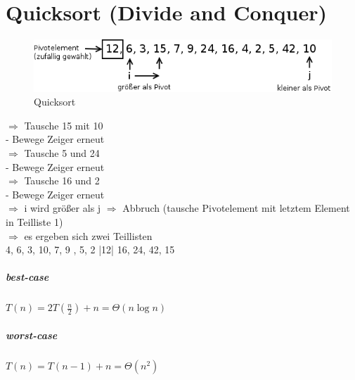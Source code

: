 \chapter{Quicksort (Divide and Conquer)}

\begin{figure}[h]
\includegraphics[width=0.6\linewidth]{05/Grafik/img1.png}
\caption{Quicksort}
\end{figure}

$\Rightarrow $ Tausche 15 mit 10 \\
- Bewege Zeiger erneut \\
$\Rightarrow $ Tausche 5 und 24 \\
- Bewege Zeiger erneut \\
$\Rightarrow $ Tausche 16 und 2 \\
- Bewege Zeiger erneut \\
$\Rightarrow $ i wird größer als j $\Rightarrow $  Abbruch (tausche Pivotelement mit letztem Element in Teilliste 1) \\
$\Rightarrow $ es ergeben sich zwei Teillisten \\

4, 6, 3, 10, 7, 9 , 5, 2 |12| 16, 24, 42, 15
\paragraph{best-case}  $T(n) = 2 T \left(\frac{n}{2} \right) + n = \Theta(n \log n) $
\paragraph{worst-case}  $T(n) = T(n-1) + n = \Theta(n^2) $

